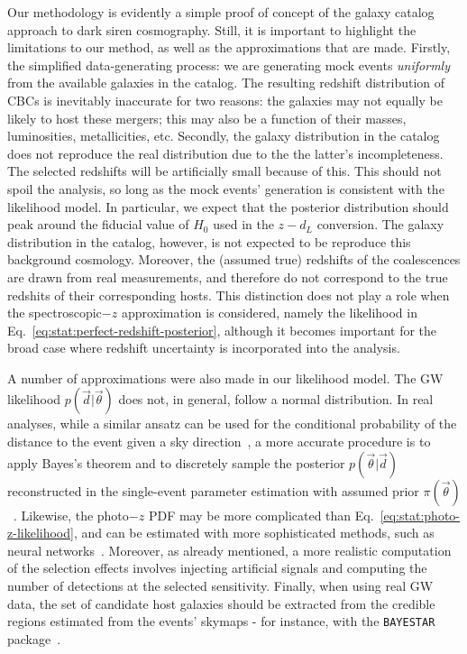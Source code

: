 \documentclass[%
preprint,
nofootinbib,
 amsmath,amssymb,
 aps,
]{revtex4-2}
\newcommand{\given}[2]{p( #1 | #2 )}
\begin{document}
Our methodology is evidently a simple proof of concept of the galaxy catalog approach to dark siren
cosmography. Still, it is important to highlight the limitations to our method, as well as the
approximations that are made. Firstly, the simplified data-generating process: we are generating
mock events \textit{uniformly} from the available galaxies in the catalog. The resulting redshift
distribution of CBCs is inevitably inaccurate for two reasons: the galaxies may not equally be
likely to host these mergers; this may also be a function of their masses, luminosities,
metallicities, etc. Secondly, the galaxy distribution in the catalog does not reproduce the real
distribution due to the the latter's incompleteness. The selected redshifts will be artificially
small because of this. This should not spoil the analysis, so long as the mock events' generation
is consistent with the likelihood model. In particular, we expect that the posterior distribution
should peak around the fiducial value of $H_0$ used in the $z-d_L$ conversion. The galaxy
distribution in the catalog, however, is not expected to be reproduce this background cosmology.
Moreover, the (assumed true) redshifts of the coalescences are drawn from real measurements, and
therefore do not correspond to the true redshits of their corresponding hosts. This distinction
does not play a role when the spectroscopic$-z$ approximation is considered, namely the likelihood
in Eq.~\eqref{eq:stat:perfect-redshift-posterior}, although it becomes important for the broad case
where redshift uncertainty is incorporated into the analysis.

A number of approximations were also made in our likelihood model. The GW likelihood
$\given{\vec{d}}{\vec{\theta}}$ does not, in general, follow a normal distribution. In real
analyses, while a similar ansatz can be used for the conditional probability of the distance to the
event given a sky direction~\cite{Singer_2016}, a more accurate procedure is to apply Bayes's
theorem and to discretely sample the posterior $\given{\vec{\theta}}{\vec{d}}$ reconstructed in the
single-event parameter estimation with assumed prior $\pi (\vec{\theta})$~\cite{Mandel:2018mve}.
Likewise, the photo$-z$ PDF may be more complicated than Eq.~\eqref{eq:stat:photo-z-likelihood},
and can be estimated with more sophisticated methods, such as neural
networks~\cite{Palmese_2023,alfradique2023dark}. Moreover, as already mentioned, a more realistic
computation of the selection effects involves injecting artificial signals and computing the number
of detections at the selected sensitivity. Finally, when using real GW data, the set of candidate
host galaxies should be extracted from the credible regions estimated from the events' skymaps -
for instance, with the \texttt{BAYESTAR} package~\cite{PhysRevD.93.024013}.
\end{document}
